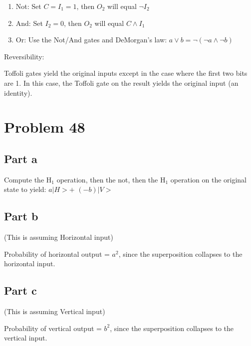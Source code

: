 \documentclass{article}
\begin{document}
\begin{enumerate}[label=]
\item Not: Set $C=I_1=1$, then $O_2$ will equal $\neg I_2$
\item And: Set $I_2=0$, then $O_2$ will equal $C \land I_1$
\item Or: Use the Not/And gates and DeMorgan's law: $a \lor b = \neg(\neg a \land \neg b)$
\end{enumerate}

\noindent Reversibility:

Toffoli gates yield the original inputs except in the case where the first two bits are 1.  In this case, the Toffoli gate on the result yields the original input (an identity).


\section{Problem 48}
\subsection{Part a}
Compute the H$_1$ operation, then the not, then the H$_1$ operation on the original state to yield: $a|H> +$ $(-b)|V>$

\subsection{Part b}
(This is assuming Horizontal input)

Probability of horizontal output = $a^2$, since the superposition collapses to the horizontal input.

\subsection{Part c}
(This is assuming Vertical input)

Probability of vertical output = $b^2$, since the superposition collapses to the vertical input.
\end{document}
